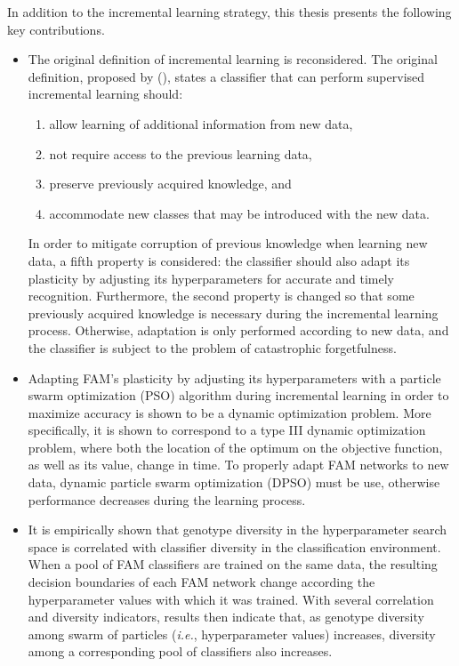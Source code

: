 In addition to the incremental learning strategy, this thesis presents the following key contributions.
\begin{itemize}
	\item The original definition of incremental learning is reconsidered.
The original definition, proposed by (\cite{polikar01}), states a classifier that can perform supervised incremental learning should:
\begin{enumerate}
	\item allow learning of additional information from new data, 
	\item not require access to the previous learning data,
	\item preserve previously acquired knowledge, and
	\item accommodate new classes that may be introduced with the new data.
\end{enumerate}
In order to mitigate corruption of previous knowledge when learning new data, a fifth property is considered: the classifier should also adapt its plasticity by adjusting its hyperparameters for accurate and timely recognition.
Furthermore, the second property is changed so that some previously acquired knowledge is necessary during the incremental learning process.
Otherwise, adaptation is only performed according to new data, and the classifier is subject to the problem of catastrophic forgetfulness.
	\item Adapting FAM's plasticity by adjusting its hyperparameters with a particle swarm optimization (PSO) algorithm during incremental learning in order to maximize accuracy is shown to be a dynamic optimization problem.
More specifically, it is shown to correspond to a type III dynamic optimization problem, where both the location of the optimum on the objective function, as well as its value, change in time.
To properly adapt FAM networks to new data, dynamic particle swarm optimization (DPSO) must be use, otherwise performance decreases during the learning process.  
	\item It is empirically shown that genotype diversity in the hyperparameter search space is correlated with classifier diversity in the classification environment.
When a pool of FAM classifiers are trained on the same data, the resulting decision boundaries of each FAM network change according the hyperparameter values with which it was trained.
With several correlation and diversity indicators, results then indicate that, as genotype diversity among swarm of particles (\emph{i.e.}, hyperparameter values) increases, diversity among a corresponding  pool of classifiers also increases.

\end{itemize}
